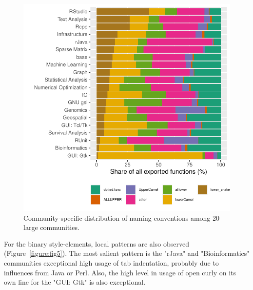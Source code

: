 \begin{figure}[htbp]
  \centering
  \includegraphics{fig4}
  \caption{Community-specific distribution of naming conventions among 20 large communities.}
  \label{figure:fig4}
\end{figure}

For the binary style-elements, local patterns are also observed (Figure~\ref{figure:fig5}). The most salient pattern is the "rJava" and "Bioinformatics" communities exceptional high usage of tab indentation, probably due to influences from Java or Perl. Also, the high level in usage of open curly on its own line for the "GUI: Gtk" is also exceptional.

